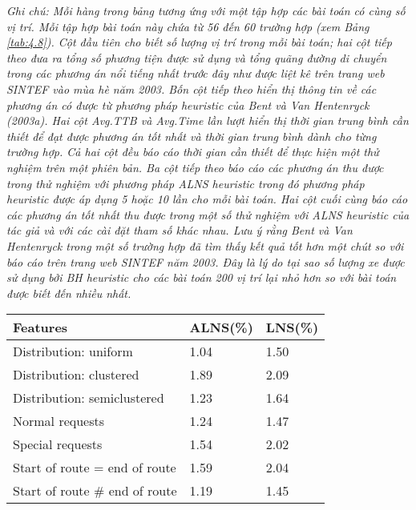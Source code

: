 \begin{table}[caption={So sánh ALNS Heuristic và những Heuristics đã có}, label=tab:4.6]
        \justify
        \textit{Ghi chú: Mỗi hàng trong bảng tương ứng với một tập hợp các bài toán có cùng số vị trí. Mỗi tập hợp bài toán này chứa từ 56 đến 60 trường hợp (xem Bảng \ref{tab:4.8}). Cột đầu tiên cho biết số lượng vị trí trong mỗi bài toán; hai cột tiếp theo đưa ra tổng số phương tiện được sử dụng và tổng quãng đường di chuyển trong các phương án nổi tiếng nhất trước đây như được liệt kê trên trang web SINTEF vào mùa hè năm 2003. Bốn cột tiếp theo hiển thị thông tin về các phương án có được từ phương pháp heuristic của Bent và Van Hentenryck (2003a). Hai cột Avg.TTB và Avg.Time lần lượt hiển thị thời gian trung bình cần thiết để đạt được phương án tốt nhất và thời gian trung bình dành cho từng trường hợp. Cả hai cột đều báo cáo thời gian cần thiết để thực hiện một thử nghiệm trên một phiên bản. Ba cột tiếp theo báo cáo các phương án thu được trong thử nghiệm với phương pháp ALNS heuristic trong đó phương pháp heuristic được áp dụng 5 hoặc 10 lần cho mỗi bài toán. Hai cột cuối cùng báo cáo các phương án tốt nhất thu được trong một số thử nghiệm với ALNS heuristic của tác giả và với các cài đặt tham số khác nhau. Lưu ý rằng Bent và Van Hentenryck trong một số trường hợp đã tìm thấy kết quả tốt hơn một chút so với báo cáo trên trang web SINTEF năm 2003. Đây là lý do tại sao số lượng xe được sử dụng bởi BH heuristic cho các bài toán 200 vị trí lại nhỏ hơn so với bài toán được biết đến nhiều nhất.}
\end{table}



\begin{table}[caption={Tóm tắt ảnh hưởng từ một số đặc tính nhất định của bài toán với phương pháp Heuristic}, label=tab:4.7]
    \begin{tabular}{lll}
        \toprule
        Features& ALNS(\%) & LNS(\%) \\ \midrule
    Distribution: uniform         & 1.04 & 1.50 \\
    Distribution: clustered       & 1.89 & 2.09       \\
    Distribution: semiclustered   & 1.23 & 1.64       \\
    Normal requests               & 1.24 & 1.47       \\
    Special requests              & 1.54 & 2.02       \\
    Start of route = end of route & 1.59 & 2.04       \\
    Start of route \# end of route & 1.19 & 1.45      
    \end{tabular} \\
\end{table}


